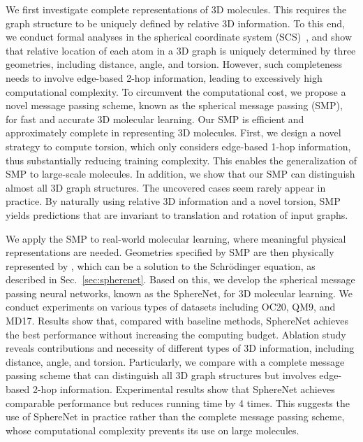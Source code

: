 \documentclass{article}
\begin{document}
We first investigate complete representations of 3D molecules.
This requires the graph structure to be uniquely defined by relative 3D information.
To this end, we conduct formal analyses in the spherical coordinate system (SCS)~\citep{chen2019clusternet}, and show that
relative location of each atom in a 3D graph is uniquely determined by three geometries, including distance, angle, and torsion.
However, such completeness needs to involve edge-based 2-hop information, leading to excessively high computational complexity.
To circumvent the computational cost, we propose a novel message passing scheme, known
as the spherical message passing (SMP),
for fast and accurate 3D molecular learning. 
Our SMP is efficient and approximately complete in representing 3D molecules.
First, we design a novel strategy to compute torsion, which only
considers edge-based 1-hop information, thus substantially reducing training complexity.
This enables the generalization of SMP to large-scale molecules.
In addition, we show that our SMP can distinguish almost all 3D graph structures.
The uncovered cases seem rarely appear in practice.
By naturally using relative 3D information and a novel torsion, SMP yields predictions that are invariant to
translation and rotation of input graphs.

We apply the SMP to real-world molecular learning, where
meaningful physical representations are needed.
\textcolor{COLOR}{Geometries  specified by SMP are then physically represented 
by , which can be a solution 
to the Schrödinger equation,
as described in Sec.~\ref{sec:spherenet}.
}
Based on this, we develop the spherical message passing neural networks,
known as the SphereNet, for 3D molecular learning.
We conduct experiments on various types of datasets including
OC20, QM9, and MD17.
Results show that, compared with baseline methods, SphereNet achieves the best performance without increasing the computing budget.
Ablation study reveals contributions and necessity of different types of 3D information, including 
distance, angle, and torsion.
Particularly, we compare with a complete message passing scheme that can distinguish all 3D graph structures but involves edge-based 2-hop information.
Experimental results
show that SphereNet achieves comparable performance but reduces running time by 4 times.
This suggests the use of SphereNet in practice rather than the complete message passing scheme, whose computational complexity prevents its use
on large molecules.
\end{document}
